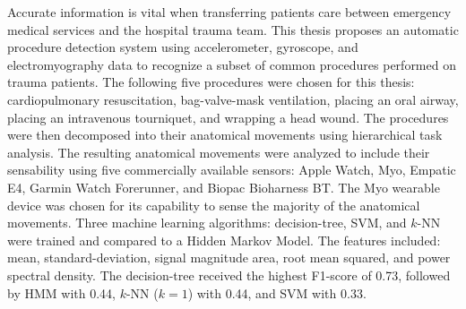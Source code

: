 
\Abstract
Accurate information is vital when transferring patients care between emergency medical services and the hospital trauma team. This thesis proposes an automatic procedure detection system using accelerometer, gyroscope, and electromyography data to recognize a subset of common procedures performed on trauma patients. The following five procedures were chosen for this thesis: cardiopulmonary resuscitation, bag-valve-mask ventilation, placing an oral airway, placing an intravenous tourniquet, and wrapping a head wound. The procedures were then decomposed into their anatomical movements using hierarchical task analysis. The resulting anatomical movements were analyzed to include their sensability using five commercially available sensors: Apple Watch, Myo, Empatic E4, Garmin Watch Forerunner, and Biopac Bioharness BT. The Myo wearable device was chosen for its capability to sense the majority of the anatomical movements. Three machine learning algorithms: decision-tree, SVM, and $k$-NN were trained and compared to a Hidden Markov Model. The features included: mean, standard-deviation, signal magnitude area, root mean squared, and power spectral density. The decision-tree received the highest F1-score of 0.73, followed by HMM with 0.44, $k$-NN ($k=1$) with 0.44, and SVM with 0.33.